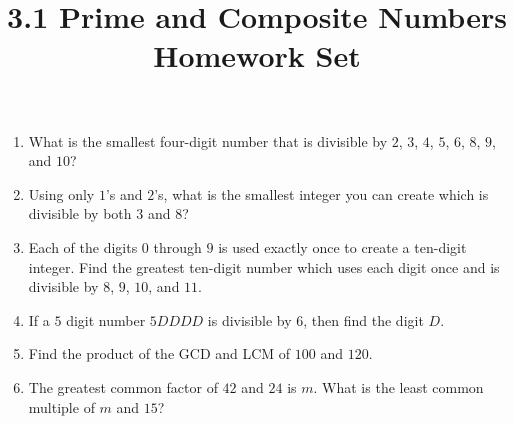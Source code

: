 \documentclass{article}
\title{3.1 Prime and Composite Numbers Homework Set}
\date{}
\author{}
\begin{document}
\maketitle
\begin{enumerate}
    \item What is the smallest four-digit number that is divisible by $2$, $3$, $4$, $5$, $6$,
        $8$, $9$, and $10$?
        \vspace{3cm}
    \item Using only $1$'s and $2$'s, what is the smallest integer you can create which is
        divisible by both $3$ and $8$?
        \vspace{3cm}
    \item Each of the digits $0$ through $9$ is used exactly once to create a ten-digit integer.
        Find the greatest ten-digit number which uses each digit once and is divisible by $8$, $9$,
        $10$, and $11$.
        \vspace{3cm}
    \item If a $5$ digit number $5DDDD$ is divisible by $6$, then find the digit $D$.
        \vspace{3cm}
    \item Find the product of the GCD and LCM of $100$ and $120$.
        \vspace{3cm}
    \item The greatest common factor of $42$ and $24$ is $m$.
        What is the least common multiple of $m$ and $15$?
        \vspace{3cm}
\end{enumerate}
\end{document}
